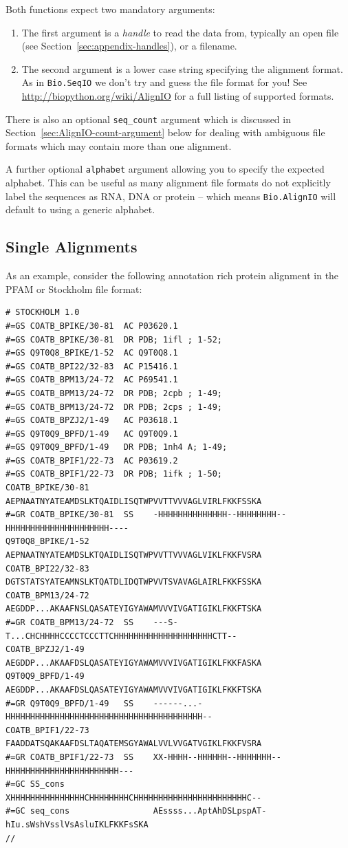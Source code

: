 \documentclass{report}
\begin{document}
Both functions expect two mandatory arguments:

\begin{enumerate}
\item The first argument is a {\it handle} to read the data from, typically an open file (see Section~\ref{sec:appendix-handles}), or a filename.
\item The second argument is a lower case string specifying the alignment format.  As in \verb|Bio.SeqIO| we don't try and guess the file format for you!  See \url{http://biopython.org/wiki/AlignIO} for a full listing of supported formats.
\end{enumerate}

\noindent There is also an optional \verb|seq_count| argument which is discussed in Section~\ref{sec:AlignIO-count-argument} below for dealing with ambiguous file formats which may contain more than one alignment.

A further optional \verb|alphabet| argument allowing you to specify the expected alphabet. This can be useful as many alignment file formats do not explicitly label the sequences as RNA, DNA or protein -- which means \verb|Bio.AlignIO| will default to using a generic alphabet.

\subsection{Single Alignments}
As an example, consider the following annotation rich protein alignment in the PFAM or Stockholm file format:

\begin{verbatim}
# STOCKHOLM 1.0
#=GS COATB_BPIKE/30-81  AC P03620.1
#=GS COATB_BPIKE/30-81  DR PDB; 1ifl ; 1-52;
#=GS Q9T0Q8_BPIKE/1-52  AC Q9T0Q8.1
#=GS COATB_BPI22/32-83  AC P15416.1
#=GS COATB_BPM13/24-72  AC P69541.1
#=GS COATB_BPM13/24-72  DR PDB; 2cpb ; 1-49;
#=GS COATB_BPM13/24-72  DR PDB; 2cps ; 1-49;
#=GS COATB_BPZJ2/1-49   AC P03618.1
#=GS Q9T0Q9_BPFD/1-49   AC Q9T0Q9.1
#=GS Q9T0Q9_BPFD/1-49   DR PDB; 1nh4 A; 1-49;
#=GS COATB_BPIF1/22-73  AC P03619.2
#=GS COATB_BPIF1/22-73  DR PDB; 1ifk ; 1-50;
COATB_BPIKE/30-81             AEPNAATNYATEAMDSLKTQAIDLISQTWPVVTTVVVAGLVIRLFKKFSSKA
#=GR COATB_BPIKE/30-81  SS    -HHHHHHHHHHHHHH--HHHHHHHH--HHHHHHHHHHHHHHHHHHHHH----
Q9T0Q8_BPIKE/1-52             AEPNAATNYATEAMDSLKTQAIDLISQTWPVVTTVVVAGLVIKLFKKFVSRA
COATB_BPI22/32-83             DGTSTATSYATEAMNSLKTQATDLIDQTWPVVTSVAVAGLAIRLFKKFSSKA
COATB_BPM13/24-72             AEGDDP...AKAAFNSLQASATEYIGYAWAMVVVIVGATIGIKLFKKFTSKA
#=GR COATB_BPM13/24-72  SS    ---S-T...CHCHHHHCCCCTCCCTTCHHHHHHHHHHHHHHHHHHHHCTT--
COATB_BPZJ2/1-49              AEGDDP...AKAAFDSLQASATEYIGYAWAMVVVIVGATIGIKLFKKFASKA
Q9T0Q9_BPFD/1-49              AEGDDP...AKAAFDSLQASATEYIGYAWAMVVVIVGATIGIKLFKKFTSKA
#=GR Q9T0Q9_BPFD/1-49   SS    ------...-HHHHHHHHHHHHHHHHHHHHHHHHHHHHHHHHHHHHHHHH--
COATB_BPIF1/22-73             FAADDATSQAKAAFDSLTAQATEMSGYAWALVVLVVGATVGIKLFKKFVSRA
#=GR COATB_BPIF1/22-73  SS    XX-HHHH--HHHHHH--HHHHHHH--HHHHHHHHHHHHHHHHHHHHHHH---
#=GC SS_cons                  XHHHHHHHHHHHHHHHCHHHHHHHHCHHHHHHHHHHHHHHHHHHHHHHHC--
#=GC seq_cons                 AEssss...AptAhDSLpspAT-hIu.sWshVsslVsAsluIKLFKKFsSKA
//
\end{verbatim}
\end{document}
